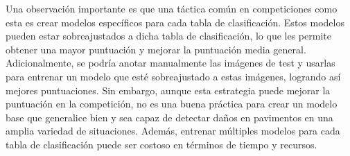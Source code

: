 Una observación importante es que una táctica común en competiciones como esta es crear modelos específicos para cada tabla de clasificación. Estos modelos pueden estar sobreajustados a dicha tabla de clasificación, lo que les permite obtener una mayor puntuación y mejorar la puntuación media general. Adicionalmente, se podría anotar manualmente las imágenes de test y usarlas para entrenar un modelo que esté sobreajustado a estas imágenes, logrando así mejores puntuaciones. Sin embargo, aunque esta estrategia puede mejorar la puntuación en la competición, no es una buena práctica para crear un modelo base que generalice bien y sea capaz de detectar daños en pavimentos en una amplia variedad de situaciones. Además, entrenar múltiples modelos para cada tabla de clasificación puede ser costoso en términos de tiempo y recursos.